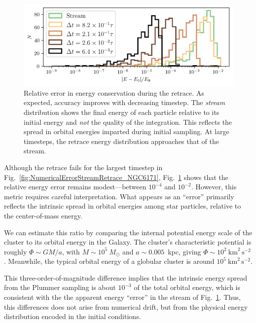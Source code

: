         \begin{figure}
            \centering
            \includegraphics[width=\linewidth]{images/NumericalErrorStreamRetrace_EnergyErrors.png}
            \caption[Relative energy error in retracing full stream generation ]{Relative error in energy conservation during the retrace. As expected, accuracy improves with decreasing timestep. The \textit{stream} distribution shows the final energy of each particle relative to its initial energy and \textit{not} the quality of the integration. This reflects the spread in orbital energies imparted during initial sampling. At large timesteps, the retrace energy distribution approaches that of the stream.}
            \label{fig:NumericalErrorStreamRetrace_EnergyErrors}
        \end{figure}

        Although the retrace fails for the largest timestep in Fig.~\ref{fig:NumericalErrorStreamRetrace_NGC6171}, Fig.~\ref{fig:NumericalErrorStreamRetrace_EnergyErrors} shows that the relative energy error remains modest—between $10^{-4}$ and $10^{-2}$. However, this metric requires careful interpretation. What appears as an ``error'' primarily reflects the intrinsic spread in orbital energies among star particles, relative to the center-of-mass energy. 

        We can estimate this ratio by comparing the internal potential energy scale of the cluster to its orbital energy in the Galaxy. The cluster's characteristic potential is roughly $\Phi \sim GM/a$, with $M \sim 10^5~M_\odot$ and $a \sim 0.005$~kpc, giving $\Phi \sim 10^2~\mathrm{km}^2\,\mathrm{s}^{-2}$. Meanwhile, the typical orbital energy of a globular cluster is around $10^5~\mathrm{km}^2\,\mathrm{s}^{-2}$. 

        This three-order-of-magnitude difference implies that the intrinsic energy spread from the Plummer sampling is about $10^{-3}$ of the total orbital energy, which is consistent with the the apparent energy ``error'' in the stream of Fig.~\ref{fig:NumericalErrorStreamRetrace_EnergyErrors}. Thus, this differences does not arise from numerical drift, but from the physical energy distribution encoded in the initial conditions. 

